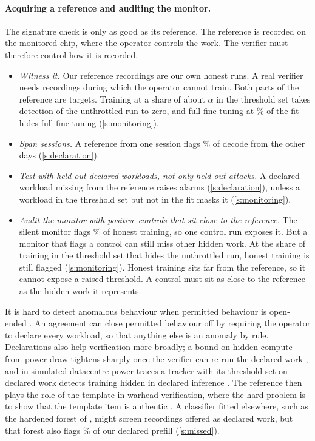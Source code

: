 \paragraph{Acquiring a reference and auditing the monitor.} The signature check is only as good as
its reference. The reference is recorded on the monitored chip, where the operator
controls the work. The verifier must therefore control how it is recorded.
\begin{itemize}
  \item \emph{Witness it.} Our reference recordings are our own honest runs. A real
        verifier needs recordings during which the operator cannot train. Both parts of
        the reference are targets. Training at a share of about $\alpha$ in the threshold
        set takes detection of the unthrottled run to zero, and full fine-tuning at
        \EfourShareHonest\% of the fit hides full fine-tuning (\cref{s:monitoring}).
  \item \emph{Span sessions.} A reference from one session flags \SessOther\% of decode
        from the other days (\cref{s:declaration}).
  \item \emph{Test with held-out declared workloads, not only held-out attacks.} A
        declared workload missing from the reference raises alarms
        (\cref{s:declaration}), unless a workload in the threshold set but not in the
        fit masks it (\cref{s:monitoring}).
  \item \emph{Audit the monitor with positive controls that sit close to the
        reference.} The silent monitor flags \TfourPosCtrl\% of honest training, so one
        control run exposes it. But a monitor that flags a control can still miss other hidden work. At the share
        of training in the threshold set that hides the unthrottled run, honest training
        is still flagged (\cref{s:monitoring}). Honest training sits far from the
        reference, so it cannot expose a raised threshold. A control must sit as close
        to the reference as the hidden work it represents.
\end{itemize}
It is hard to detect anomalous behaviour when permitted behaviour is open-ended \citep{sommer2010}. An agreement can close permitted behaviour off by requiring the operator to declare every workload, so that
anything else is an anomaly by rule. Declarations also help verification more broadly; a bound on hidden compute from power draw tightens sharply once the verifier can re-run
the declared work \citep{kimpson2026}, and in simulated datacentre power traces a tracker
with its threshold set on declared work detects training hidden in declared inference
\citep{kimpson2026datacentre}. The reference then plays the role of the template in warhead verification, where
the hard problem is to show that the template item is authentic \citep{yan2015}. A
classifier fitted elsewhere, such as the hardened forest of \citet{gargiulo2026}, might
screen recordings offered as declared work, but that forest also flags \GkHardPrefill\%
of our declared prefill (\cref{s:missed}).

